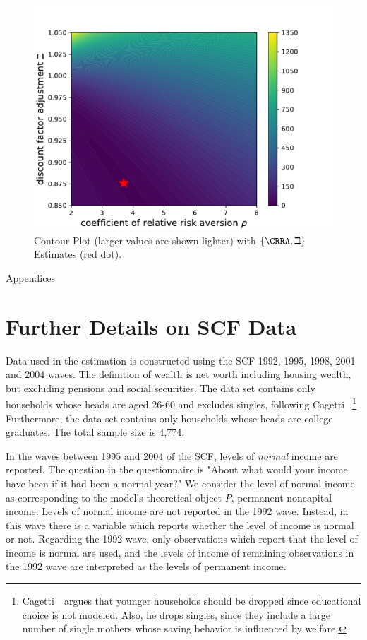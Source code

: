 \documentclass[titlepage, headings=optiontotocandhead]{\econtex}
\begin{document}
\hypertarget{PlotContourMedianStrEst}{}
\begin{figure}
  \includegraphics[width=6in]{./Figures/SMMcontour.pdf}
  \caption{Contour Plot (larger values are shown lighter) with $\{\CRRA,{\beth}\}$ Estimates (red dot).}
  \label{fig:PlotContourMedianStrEst}
\end{figure}

\clearpage\vfill\eject

\appendix

\centerline{\LARGE Appendices}\vspace{0.2in}

\section{Further Details on SCF Data}\label{app:SCFdata}

Data used in the estimation is constructed using the SCF 1992, 1995, 1998, 2001 and 2004 waves. The definition of wealth is net worth including housing wealth, but excluding pensions and social securities. The data set contains only households whose heads are aged 26-60 and excludes singles, following Cagetti~\citeyearpar{cagettiWprofiles}.\footnote{Cagetti~\citeyearpar{cagettiWprofiles}\ argues that younger households should be dropped since educational choice is not modeled. Also, he drops singles, since they include a large number of single mothers whose saving behavior is influenced by welfare.} Furthermore, the data set contains only households whose heads are college graduates. The total sample size is 4,774.

In the waves between 1995 and 2004 of the SCF, levels of
\textit{normal} income are reported. The question in the questionnaire
is "About what would your income have been if it had been a normal
year?" We consider the level of normal income as corresponding to the
model's theoretical object $P$, permanent noncapital income. Levels of
normal income are not reported in the 1992 wave. Instead, in this wave
there is a variable which reports whether the level of income is
normal or not. Regarding the 1992 wave, only observations which report
that the level of income is normal are used, and the levels of income
of remaining observations in the 1992 wave are interpreted as the
levels of permanent income.
\end{document}
